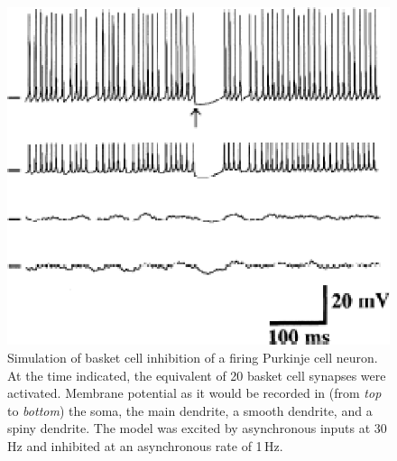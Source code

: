 \documentclass[12pt]{article}
\begin{document}
\clearpage

\begin{figure}[h]
\centering
   \includegraphics[scale=0.75]{figures/Fig.2.12.eps}
   \caption {Simulation of basket cell inhibition of a firing Purkinje cell neuron. At the time indicated, the equivalent of 20 basket cell synapses were activated. Membrane potential as it would be recorded in (from {\em top} to {\em bottom}) the soma, the main dendrite, a smooth dendrite, and a spiny
dendrite. The model was excited by asynchronous inputs at 30\,Hz and
inhibited at an asynchronous rate of 1\,Hz.}
   \label{fig:DS2.12}
\end{figure}



\end{document}
